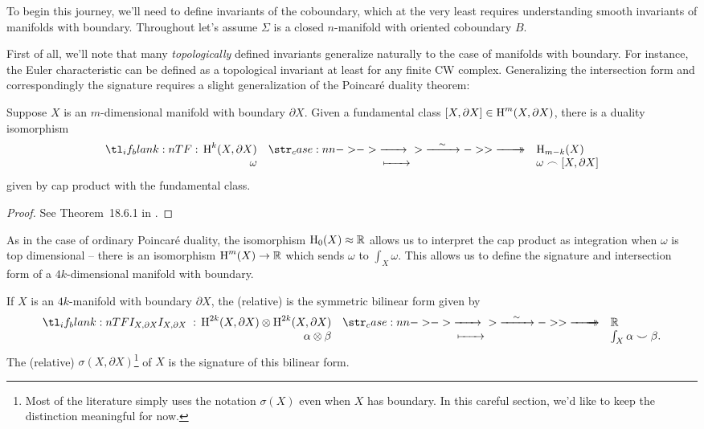 To begin this journey, we'll need to define invariants of the coboundary, which at the very least requires understanding
smooth invariants of manifolds with boundary.
Throughout let's assume $\Sigma$ is a closed $n$-manifold with oriented coboundary $B$.

First of all, we'll note that many \emph{topologically} defined invariants generalize naturally to the case of manifolds with boundary. For instance, the Euler characteristic can be defined as a topological invariant at least for any finite CW complex. Generalizing the intersection form and correspondingly the signature requires a slight generalization of the Poincar\'e duality theorem:
\begin{theorem}
	Suppose $X$ is an $m$-dimensional manifold with boundary $\partial X$. Given a fundamental class $[X, \partial X]\in \operatorname{H}^{m}(X, \partial X)$, there is a duality isomorphism
	\[
		\lkxfunc{}{\H^k(X, \partial X)}{\H_{m-k}(X)}{\omega}{\omega\frown [X,\partial X]}
	\]
	given by cap product with the fundamental class.
\end{theorem}
\begin{proof}
	See Theorem~18.6.1 in \cite{dieck2008algebraic}.
\end{proof}
As in the case of ordinary Poincar\'e duality, the isomorphism $\operatorname{H}_0(X)\approx \mathbb{R}$ allows us to interpret the cap product as integration when $\omega$ is top dimensional -- there is an isomorphism $\operatorname{H}^m(X)\to \mathbb{R}$ which sends $\omega$ to $\int_X \omega$. This allows us to define the signature and intersection form of a $4k$-dimensional manifold with boundary.

\begin{definition}
	If $X$ is an $4k$-manifold with boundary $\partial X$, the (relative)  is the symmetric bilinear form given by
	\[
		\lkxfunc{I_{X,\partial X}}{\H^{2k}(X, \partial X)\otimes \H^{2k}(X, \partial X)}
		{\R}{\alpha\otimes \beta}{\int_X \alpha\smile \beta.}
	\]
	The (relative)  $\sigma(X, \partial X)$\footnote{Most of the literature simply uses the notation $\sigma(X)$ even when $X$ has boundary. In this careful section, we'd like to keep the distinction meaningful for now.} of $X$ is the signature of this bilinear form.
\end{definition}

